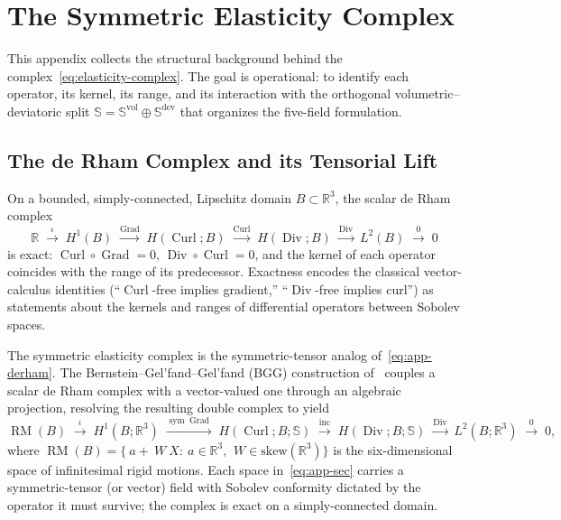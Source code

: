 \documentclass[12pt]{article}
\newcommand{\Reals}{\mathbb{R}}
\newcommand{\Syms}{\mathbb{S}}
\newcommand{\supvol}{^{\mathrm{vol}}}
\newcommand{\supdev}{^{\mathrm{dev}}}
\newcommand{\Symsd}{\mathbb{S}\supdev}
\DeclareMathOperator{\Div}{Div}
\DeclareMathOperator{\Grad}{Grad}
\DeclareMathOperator{\Curl}{Curl}
\DeclareMathOperator{\sym}{sym}
\begin{document}
\section{The Symmetric Elasticity Complex}
\label{app:sec}

This appendix collects the structural background behind the
complex~\eqref{eq:elasticity-complex}. The goal is operational: to
identify each operator, its kernel, its range, and its interaction
with the orthogonal volumetric--deviatoric split
$\Syms = \Syms\supvol \oplus \Symsd$ that organizes the five-field
formulation.

\subsection{The de Rham Complex and its Tensorial Lift}
\label{app:sec-derham}

On a bounded, simply-connected, Lipschitz domain
$B \subset \Reals^3$, the scalar de Rham complex
\begin{equation}
  \label{eq:app-derham}
  \Reals
  \;\xrightarrow{\iota}\;
  H^1(B)
  \;\xrightarrow{\Grad}\;
  H(\Curl; B)
  \;\xrightarrow{\Curl}\;
  H(\Div; B)
  \;\xrightarrow{\Div}\;
  L^2(B)
  \;\xrightarrow{0}\; 0
\end{equation}
is exact: $\Curl \circ \Grad = 0$, $\Div \circ \Curl = 0$, and the
kernel of each operator coincides with the range of its predecessor.
Exactness encodes the classical vector-calculus identities
(``$\Curl$-free implies gradient,'' ``$\Div$-free implies curl'') as
statements about the kernels and ranges of differential operators
between Sobolev spaces.

The symmetric elasticity complex is the symmetric-tensor analog
of~\eqref{eq:app-derham}. The Bernstein--Gel'fand--Gel'fand (BGG)
construction of~\citet{Arnold.Falk.Winther:2006a,
Arnold.Falk.Winther:2010} couples a scalar de Rham complex with a
vector-valued one through an algebraic projection, resolving the
resulting double complex to yield
\begin{equation}
  \label{eq:app-sec}
  \operatorname{RM}(B)
  \;\xrightarrow{\iota}\;
  H^1(B; \Reals^3)
  \;\xrightarrow{\sym\Grad}\;
  H(\Curl; B; \Syms)
  \;\xrightarrow{\mathrm{inc}}\;
  H(\Div; B; \Syms)
  \;\xrightarrow{\Div}\;
  L^2(B; \Reals^3)
  \;\xrightarrow{0}\; 0,
\end{equation}
where $\operatorname{RM}(B) = \{ ~a + ~W ~X : ~a \in \Reals^3,\,
~W \in \mathrm{skew}(\Reals^3) \}$ is the six-dimensional space of
infinitesimal rigid motions. Each space in~\eqref{eq:app-sec} carries
a symmetric-tensor (or vector) field with Sobolev conformity
dictated by the operator it must survive; the complex is exact on a
simply-connected domain.
\end{document}
